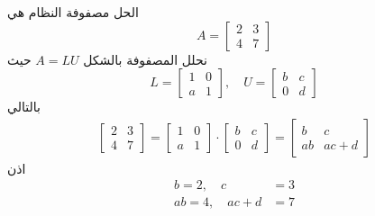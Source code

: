 	\begin{frame}
		\begin{exampleblock}{الحل}
			مصفوفة النظام هي 
			\[
			A = 
			\begin{bmatrix}
				2&3\\
				4&7
			\end{bmatrix}
			\]
			نحلل المصفوفة بالشكل $A = LU$ حيث
			\[
			L = 
			\begin{bmatrix}
				1 & 0\\
				a & 1
			\end{bmatrix},\quad
			U = 
			\begin{bmatrix}
				b & c\\
				0 & d
			\end{bmatrix}
			\]
			بالتالي
			\begin{align*}
				\begin{bmatrix}
					2&3\\
					4&7
				\end{bmatrix} =
				\begin{bmatrix}
					1 & 0\\
					a & 1
				\end{bmatrix}\cdot
				\begin{bmatrix}
					b & c\\
					0 & d
				\end{bmatrix}
				= 
				\begin{bmatrix}
					b & c\\
					ab & ac + d
				\end{bmatrix}
			\end{align*}
			اذن 
			\begin{align*}
				b = 2,\quad
				c&= 3\\
				ab = 4,\quad
				ac + d &= 7 
			\end{align*}
		\end{exampleblock}
	\end{frame}
	
